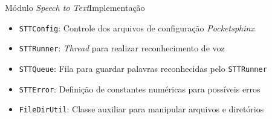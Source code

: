 \begin{frame}{Módulo \textit{Speech to Text}}{Implementação}

\begin{itemize}
\item<2-> \texttt{STTConfig}: Controle dos arquivos de configuração \textit{Pocketsphinx}
\item<3-> \texttt{STTRunner}: \textit{Thread} para realizar reconhecimento de voz
\item<4-> \texttt{STTQueue}: Fila para guardar palavras reconhecidas pelo \texttt{STTRunner}
\item<5-> \texttt{STTError}: Definição de constantes numéricas para possíveis erros
\item<6-> \texttt{FileDirUtil}: Classe auxiliar para manipular arquivos e diretórios
\end{itemize}

\end{frame}
